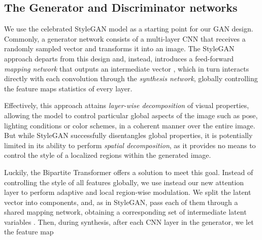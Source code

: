 \documentclass{article}
\begin{document}
\subsection{The Generator and Discriminator networks}
\label{gan}
We use the celebrated StyleGAN model as a starting point for our GAN design. Commonly, a generator network consists of a multi-layer CNN that receives a randomly sampled vector  and transforms it into an image. The StyleGAN approach departs from this design and, instead, introduces a feed-forward \textit{mapping network} that outputs an intermediate vector , which in turn interacts directly with each convolution through the \textit{synthesis network}, globally controlling the feature maps statistics of every layer. 

Effectively, this approach attains \textit{layer-wise decomposition} of visual properties, allowing the model to control particular global aspects of the image such as pose, lighting conditions or color schemes, in a coherent manner over the entire image. But while StyleGAN successfully disentangles global properties, it is potentially limited in its ability to perform \textit{spatial decomposition}, as it provides no means to control the style of a localized regions within the generated image. 

Luckily, the Bipartite Transformer offers a solution to meet this goal. Instead of controlling the style of all features globally, we  use instead our new attention layer to perform adaptive and local region-wise modulation. We split the latent vector  into  components,  and, as in StyleGAN, pass each of them through a shared mapping network, obtaining a corresponding set of intermediate latent variables . Then, during synthesis, after each CNN layer in the generator, we let the feature map 

\clearpage
\end{document}
